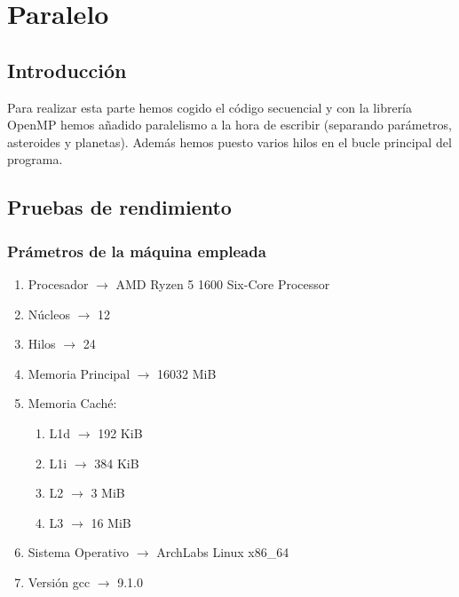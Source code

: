 \documentclass[12pt]{article}
\begin{document}
    \section{Paralelo}
        \subsection{Introducción}
        \noindent Para realizar esta parte hemos cogido el código secuencial y con la librería OpenMP hemos añadido paralelismo a la hora de escribir (separando parámetros, asteroides y planetas). Además hemos puesto varios hilos en el bucle principal del programa.
        \subsection{Pruebas de rendimiento}
        \subsubsection{Prámetros de la máquina empleada}
            \begin{enumerate}
                \item Procesador $\rightarrow$ AMD Ryzen 5 1600 Six-Core Processor
                \item Núcleos $\rightarrow$ 12
                \item Hilos $\rightarrow$ 24
                \item Memoria Principal $\rightarrow$ 16032 MiB
                \item Memoria Caché:
                    \begin{enumerate}
                        \item L1d $\rightarrow$ 192 KiB
                        \item L1i $\rightarrow$ 384 KiB
                        \item L2 $\rightarrow$ 3 MiB
                        \item L3 $\rightarrow$ 16 MiB
                    \end{enumerate}
                \item Sistema Operativo $\rightarrow$ ArchLabs Linux x86\_64
                \item Versión gcc $\rightarrow$ 9.1.0
            \end{enumerate}
        \newpage
\end{document}
